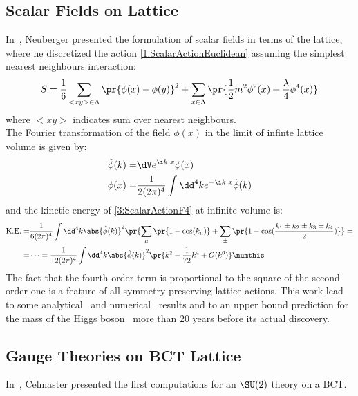 \subsection{Scalar Fields on \spFtext Lattice}
In~\cite{Neuberger:1987kt}, Neuberger presented the formulation of scalar fields in terms of the \spFtext lattice, where he discretized the action \eqref{1:ScalarActionEuclidean} assuming the simplest nearest neighbours interaction:
\begin{equation}
    S = \frac16\sum_{<xy>\in\Lambda}\pr{\phi(x)-\phi(y)}^2 +\sum_{x\in\Lambda}\pr{\frac12m^2\phi^2(x)+\frac\lambda4\phi^4(x)} \label{3:ScalarActionF4}
\end{equation}
where $<xy>$ indicates sum over nearest neighbours.\\
The Fourier transformation of the field $\phi(x)$ in the limit of infinte lattice volume is given by:
\begin{align*}
    \tilde\phi(k) =& \dV e^{\i k \cdot x} \phi(x) \\
    \phi(x) =& \frac1{2(2\pi)^4} \int\dd^4k e^{-\i k \cdot x} \tilde\phi(k)
\end{align*}
and the kinetic energy of \eqref{3:ScalarActionF4} at infinite volume is:
\begin{align*}
    \text{K.E.} =& \frac1{6(2\pi)^4} \int\dd^4k \abs{\tilde\phi(k)}^2\pr{\sum_\mu\pr{1-\cos(k_\mu)} +\sum_\pm\pr{1-\cos(\frac{k_1\pm k_2\pm k_3\pm k_4}{2})}} =\\
    =& \dots = \frac{1}{12(2\pi)^4} \int\dd^4k \abs{\tilde\phi(k)}^2\pr{k^2-\frac{1}{72}k^4+O(k^6)} \numthis\label{3:ScalarKE}
\end{align*}
The fact that the fourth order term is proportional to the square of the second order one is a feature of all symmetry-preserving lattice actions.
This work lead to some analytical~\cite{Bhanot:1990zd} and numerical~\cite{Bhanot:1990ai} results and to an upper bound prediction for the mass of the Higgs boson~\cite{Heller:1990sg} more than $20$ years before its actual discovery.

\subsection{Gauge Theories on BCT Lattice}
In~\cite{Celmaster:1982ht}, Celmaster presented the first computations for an $\SU(2)$ theory on a BCT.

